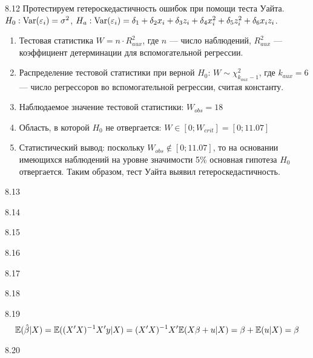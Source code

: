 \protect \hypertarget {soln:8.12}{}
\begin{solution}{{8.12}}
Протестируем гетероскедастичность ошибок при помощи теста Уайта. $H_0: \operatorname{Var}(\varepsilon_i)=\sigma^2$, $H_a: \operatorname{Var}(\varepsilon_i)=\delta_1+\delta_2 x_i +\delta_3 z_i+\delta_4 x_i^2+\delta_5 z_i^2+\delta_6 x_i z_i$.
\begin{enumerate}
\item Тестовая статистика $W=n\cdot R^2_{aux}$, где $n$ — число наблюдений, $R^2_{aux}$ — коэффициент детерминации для вспомогательной регрессии.
\item Распределение тестовой статистики при верной $H_0$: $W\sim \chi^2_{k_{aux}-1}$, где $k_{aux}=6$ — число регрессоров во вспомогательной регрессии, считая константу.
\item Наблюдаемое значение тестовой статистики: $W_{obs}=18$
\item Область, в которой $H_0$ не отвергается: $W\in [0;W_{crit}]=[0;11.07]$
\item Статистический вывод: поскольку $W_{obs} \notin [0;11.07]$, то на основании имеющихся наблюдений на уровне значимости 5\% основная гипотеза $H_0$ отвергается. Таким образом, тест Уайта выявил гетероскедастичность.
\end{enumerate}
\end{solution}
\protect \hypertarget {soln:8.13}{}
\begin{solution}{{8.13}}
\end{solution}
\protect \hypertarget {soln:8.14}{}
\begin{solution}{{8.14}}
\end{solution}
\protect \hypertarget {soln:8.15}{}
\begin{solution}{{8.15}}
\end{solution}
\protect \hypertarget {soln:8.16}{}
\begin{solution}{{8.16}}
\end{solution}
\protect \hypertarget {soln:8.17}{}
\begin{solution}{{8.17}}
\end{solution}
\protect \hypertarget {soln:8.18}{}
\begin{solution}{{8.18}}
\end{solution}
\protect \hypertarget {soln:8.19}{}
\begin{solution}{{8.19}}
\[
\mathbb{E}(\hat{\beta}|X) = \mathbb{E}((X'X)^{-1}X'y|X)=(X'X)^{-1}X'\mathbb{E}(X\beta + u|X)=\beta + \mathbb{E}(u|X)=\beta
\]
\end{solution}
\protect \hypertarget {soln:8.20}{}
\begin{solution}{{8.20}}
\end{solution}
